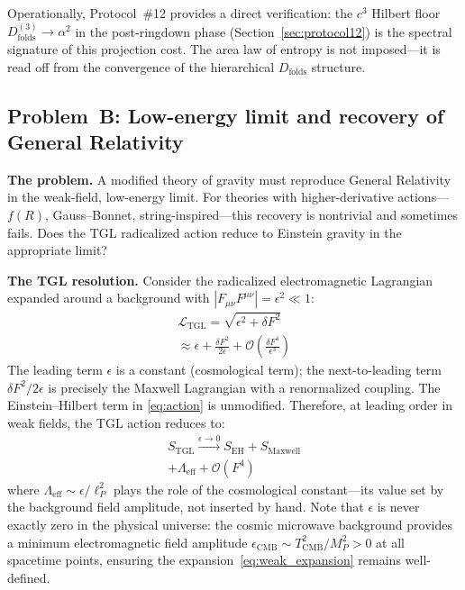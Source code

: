 \documentclass[12pt,a4paper,twocolumn]{article}
\newcommand{\alphaii}{\alpha^{2}}
\newcommand{\Dfolds}{D_{\text{folds}}}
\begin{document}
Operationally, Protocol~\#12 provides a direct verification: the $c^3$ Hilbert 
floor $D_{\text{folds}}^{(3)} \to \alphaii$ in the post-ringdown phase 
(Section~\ref{sec:protocol12}) is the spectral signature of this projection 
cost. The area law of entropy is not imposed---it is read off from the 
convergence of the hierarchical $\Dfolds$ structure.

\subsection{Problem~B: Low-energy limit and recovery of General Relativity}
\label{sec:problem_b}

\textbf{The problem.} A modified theory of gravity must reproduce General 
Relativity in the weak-field, low-energy limit. For theories with 
higher-derivative actions---$f(R)$, Gauss--Bonnet, string-inspired---this 
recovery is nontrivial and sometimes fails. Does the TGL radicalized action 
reduce to Einstein gravity in the appropriate limit?

\textbf{The TGL resolution.} Consider the radicalized electromagnetic Lagrangian 
expanded around a background with $|F_{\mu\nu}F^{\mu\nu}| = \epsilon^2 \ll 1$:
\begin{multline}
\mathcal{L}_{\text{TGL}} = \sqrt{\epsilon^2 + \delta F^2} \\
\approx \epsilon 
+ \frac{\delta F^2}{2\epsilon} + \mathcal{O}\!\left(\frac{\delta F^4}{\epsilon^3}
\right)
\label{eq:weak_expansion}
\end{multline}
The leading term $\epsilon$ is a constant (cosmological term); the 
next-to-leading term $\delta F^2 / 2\epsilon$ is precisely the Maxwell 
Lagrangian with a renormalized coupling. The Einstein--Hilbert term in 
\eqref{eq:action} is unmodified. Therefore, at leading order in weak fields, 
the TGL action reduces to:
\begin{multline}
S_{\text{TGL}} \xrightarrow{\epsilon \to 0} S_{\text{EH}} + S_{\text{Maxwell}} \\
+ \Lambda_{\text{eff}} + \mathcal{O}(F^4)
\label{eq:GR_limit}
\end{multline}
where $\Lambda_{\text{eff}} \sim \epsilon/\ell_P^2$ plays the role of the 
cosmological constant---its value set by the background field amplitude, not 
inserted by hand. Note that $\epsilon$ is never exactly zero in the physical 
universe: the cosmic microwave background provides a minimum electromagnetic 
field amplitude $\epsilon_{\text{CMB}} \sim T_{\text{CMB}}^2 / M_P^2 > 0$ 
at all spacetime points, ensuring the expansion~\eqref{eq:weak_expansion} 
remains well-defined.
\end{document}
